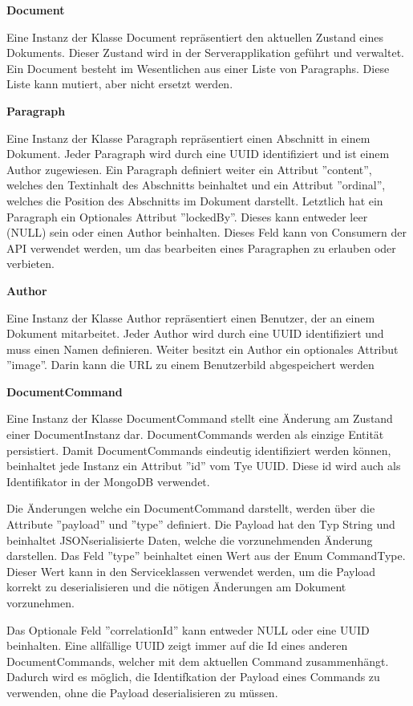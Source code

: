 \textbf{Document}

Eine Instanz der Klasse Document repräsentiert den aktuellen Zustand eines Dokuments.
Dieser Zustand wird in der Serverapplikation geführt und verwaltet.
Ein Document besteht im Wesentlichen aus einer Liste von Paragraphs.
Diese Liste kann mutiert, aber nicht ersetzt werden.

\textbf{Paragraph}

Eine Instanz der Klasse Paragraph repräsentiert einen Abschnitt in einem Dokument.
Jeder Paragraph wird durch eine UUID identifiziert und ist einem Author zugewiesen.
Ein Paragraph definiert weiter ein Attribut ''content'',  welches den Textinhalt des Abschnitts beinhaltet und ein Attribut ''ordinal'', welches die Position des Abschnitts im Dokument darstellt.
Letztlich hat ein Paragraph ein Optionales Attribut ''lockedBy''.
Dieses kann entweder leer (NULL) sein oder einen Author beinhalten.
Dieses Feld kann von Consumern der API verwendet werden, um das bearbeiten eines Paragraphen zu erlauben oder verbieten.

\textbf{Author}

Eine Instanz der Klasse Author repräsentiert einen Benutzer, der an einem Dokument mitarbeitet.
Jeder Author wird durch eine UUID identifiziert und muss einen Namen definieren.
Weiter besitzt ein Author ein optionales Attribut ''image''.
Darin kann die URL zu einem Benutzerbild abgespeichert werden

\clearpage

\textbf{DocumentCommand}

Eine Instanz der Klasse DocumentCommand stellt eine Änderung am Zustand einer Document\-Instanz dar.
DocumentCommands werden als einzige Entität persistiert.
Damit DocumentCommands eindeutig identifiziert werden können, beinhaltet jede Instanz ein Attribut ''id'' vom Tye UUID\@.
Diese id wird auch als Identifikator in der MongoDB verwendet.

Die Änderungen welche ein DocumentCommand darstellt, werden über die Attribute ''payload'' und ''type'' definiert.
Die Payload hat den Typ String und beinhaltet JSON\-serialisierte Daten, welche die vorzunehmenden Änderung darstellen.
Das Feld ''type'' beinhaltet einen Wert aus der Enum CommandType.
Dieser Wert kann in den Serviceklassen verwendet werden, um die Payload korrekt zu deserialisieren und die nötigen Änderungen am Dokument vorzunehmen.

Das Optionale Feld ''correlationId'' kann entweder NULL oder eine UUID beinhalten.
Eine allfällige UUID zeigt immer auf die Id eines anderen DocumentCommands, welcher mit dem aktuellen Command zusammenhängt.
Dadurch wird es möglich, die Identifkation der Payload eines Commands zu verwenden, ohne die Payload deserialisieren zu müssen.

